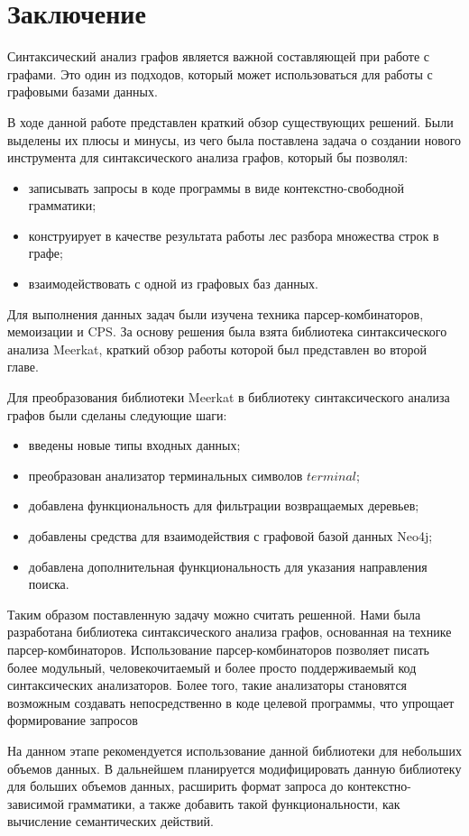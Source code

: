 \section*{Заключение}
Синтаксический анализ графов является важной составляющей при работе с графами. Это один из подходов, который может использоваться для
работы с графовыми базами данных.

В ходе данной работе представлен краткий обзор существующих решений. Были выделены их плюсы и минусы, из чего была поставлена задача о создании нового инструмента для синтаксического анализа графов, который бы позволял:

\begin{itemize}
\item записывать запросы в коде программы в виде контекстно-свободной грамматики;
\item конструирует в качестве результата работы лес разбора
множества строк в графе;
\item взаимодействовать с одной из графовых баз данных.
\end{itemize}

Для выполнения данных задач были изучена техника парсер-комбинаторов, мемоизации и CPS. За основу решения была взята библиотека
синтаксического анализа Meerkat, краткий обзор работы которой был представлен во второй главе.

Для преобразования библиотеки Meerkat в библиотеку синтаксического анализа графов были сделаны следующие шаги:
\begin{itemize}
\item введены новые типы входных данных;
\item преобразован анализатор терминальных символов $terminal$;
\item добавлена функциональность для фильтрации возвращаемых деревьев;
\item добавлены средства для взаимодействия с графовой базой данных Neo4j;
\item добавлена дополнительная функциональность для указания направления поиска.
\end{itemize}

Таким образом поставленную задачу можно считать решенной. Нами была разработана библиотека синтаксического анализа графов, основанная
на технике парсер-комбинаторов. Использование парсер-комбинаторов позволяет писать более модульный, человекочитаемый и более просто поддерживаемый код синтаксических анализаторов. Более того, такие анализаторы становятся возможным создавать непосредственно в коде
целевой программы, что упрощает формирование запросов 

На данном этапе рекомендуется использование данной библиотеки для небольших объемов данных. В дальнейшем планируется модифицировать
данную библиотеку для больших объемов данных, расширить формат запроса до контекстно-зависимой грамматики, а также добавить такой функциональности, как вычисление семантических действий.